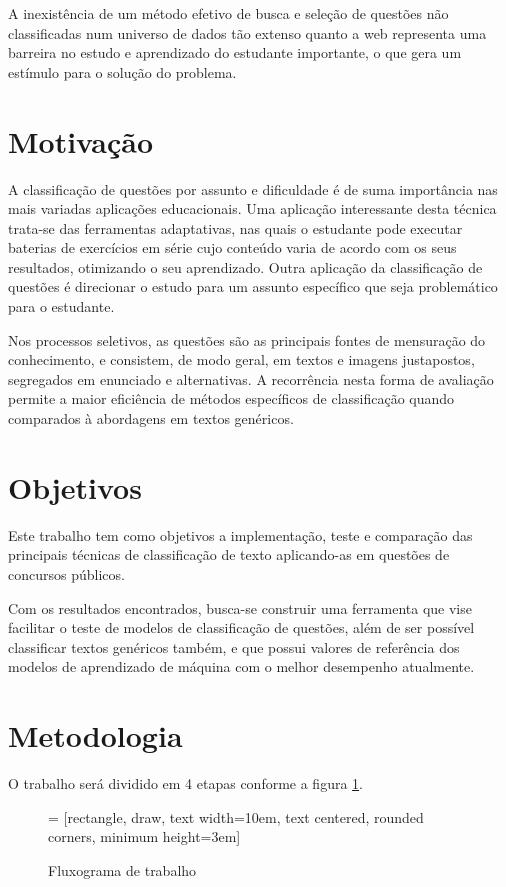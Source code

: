 A inexistência de um método efetivo de busca e seleção de questões não classificadas num universo de dados tão extenso quanto a web representa uma barreira no estudo e aprendizado do estudante importante, o que gera um estímulo para o solução do problema.

\section{Motivação}
A classificação de questões por assunto e dificuldade é de suma importância nas mais variadas aplicações educacionais. Uma aplicação interessante desta técnica trata-se das ferramentas adaptativas, nas quais o estudante pode executar baterias de exercícios em série cujo conteúdo varia de acordo com os seus resultados, otimizando o seu aprendizado. Outra aplicação da classificação de questões é direcionar o estudo para um assunto específico que seja problemático para o estudante.

Nos processos seletivos, as questões são as principais fontes de mensuração do conhecimento, e consistem, de modo geral, em textos e imagens justapostos, segregados em enunciado e alternativas. A recorrência nesta forma de avaliação permite a maior eficiência de métodos específicos de classificação quando comparados à abordagens em textos genéricos.

\section{Objetivos}
Este trabalho tem como objetivos a implementação, teste e comparação das principais técnicas de classificação de texto aplicando-as em questões de concursos públicos.

Com os resultados encontrados, busca-se construir uma ferramenta que vise facilitar o teste de modelos de classificação de questões, além de ser possível classificar textos genéricos também, e que possui valores de referência dos modelos de aprendizado de máquina com o melhor desempenho atualmente.

\section{Metodologia}
\label{sec:metodology}
O trabalho será dividido em 4 etapas conforme a figura \ref{fig:fluxogram}.

\begin{figure}[!ht]
  \centering
   = [rectangle, draw, text width=10em, text centered, rounded      corners, minimum height=3em]
  \caption{Fluxograma de trabalho}
  \label{fig:fluxogram}
\end{figure}

